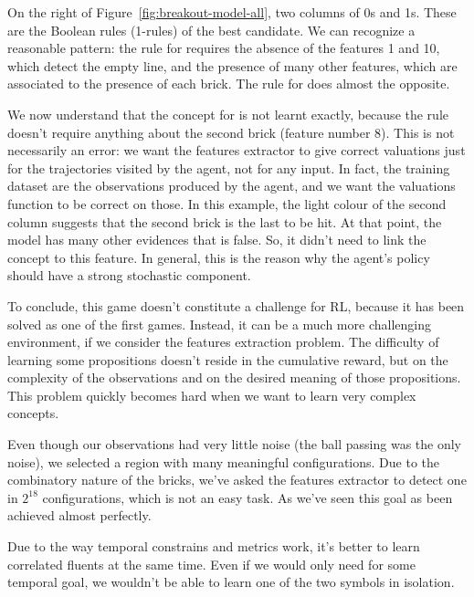 On the right of Figure~\ref{fig:breakout-model-all}, two columns of 0s and 1s.
These are the Boolean rules (1-rules) of the best candidate. We can recognize
a reasonable pattern: the rule for  requires the absence of the
features 1 and 10, which detect the empty line, and the presence of many
other features, which are associated to the presence of each brick. The rule
for  does almost the opposite.

We now understand that the concept for  is not learnt exactly,
because the rule doesn't require anything about the second brick (feature
number 8). This is not necessarily an error: we want the features extractor to
give correct valuations just for the trajectories visited by the agent, not
for any input. In fact, the training dataset are the observations produced by
the agent, and we want the valuations function to be correct on those. In this
example, the light colour of the second column suggests that the second brick
is the last to be hit. At that point, the model has many other evidences that
 is false. So, it didn't need to link the concept to this
feature. In general, this is the reason why the agent's policy should have a
strong stochastic component.

To conclude, this game doesn't constitute a challenge for RL, because it has
been solved as one of the first games. Instead, it can be a much more
challenging environment, if we consider the features extraction problem. The
difficulty of learning some propositions doesn't reside in the cumulative
reward, but on the complexity of the observations and on the desired meaning
of those propositions. This problem quickly becomes hard when we want to learn
very complex concepts.

Even though our observations had very little noise (the ball passing was the
only noise), we selected a region with many meaningful configurations. Due to
the combinatory nature of the bricks, we've asked the features extractor to
detect one in $2^{18}$ configurations, which is not an easy task. As we've
seen this goal as been achieved almost perfectly.

Due to the way temporal constrains and metrics work, it's better to learn
correlated fluents at the same time. Even if we would only need 
for some temporal goal, we wouldn't be able to learn one of the two symbols in
isolation.

\let\sectionbreak\savedsectionbreak


